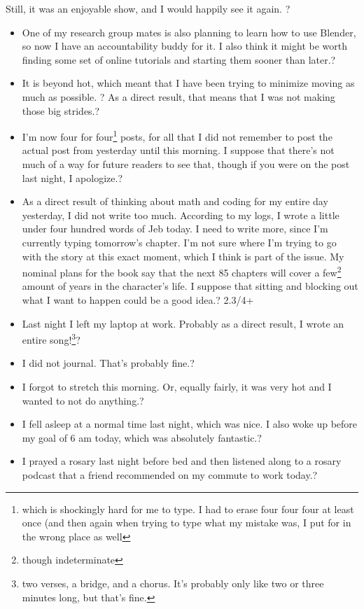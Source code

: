 \documentclass[12pt]{article}[titlepage]
\newcommand{\1}{\={a}}
\newcommand{\2}{\={e}}
\newcommand{\3}{\={\i}}
\newcommand{\4}{\=o}
\newcommand{\5}{\=u}
\newcommand{\6}{\={A}}
\renewcommand{\,}{\textsuperscript{,}}
\begin{document}
Still, it was an enjoyable show, and I would happily see it again.
?
\begin{itemize}
\item One of my research group mates is also planning to learn how to use Blender, so now I have an accountability buddy for it.
I also think it might be worth finding some set of online tutorials and starting them sooner than later.?
\item It is beyond hot, which meant that I have been trying to minimize moving as much as possible. ?
As a direct result, that means that I was not making those big strides.?
\item I'm now four for four\footnote{which is shockingly hard for me to type. I had to erase four four four at least once (and then again when trying to type what my mistake was, I put for in the wrong place as well} posts, for all that I did not remember to post the actual post from yesterday until this morning.
I suppose that there's not much of a way for future readers to see that, though if you were on the post last night, I apologize.?
\item As a direct result of thinking about math and coding for my entire day yesterday, I did not write too much. According to my logs, I wrote a little under four hundred words of Jeb today. I need to write more, since I'm currently typing tomorrow's chapter.
I'm not sure where I'm trying to go with the story at this exact moment, which I think is part of the issue.
My nominal plans for the book say that the next 85 chapters will cover a few\footnote{though indeterminate} amount of years in the character's life.
I suppose that sitting and blocking out what I want to happen could be a good idea.?
2.3/4+
\item Last night I left my laptop at work.
Probably as a direct result, I wrote an entire song!\footnote{two verses, a bridge, and a chorus.
It's probably only like two or three minutes long, but that's fine.}?
\item I did not journal. That's probably fine.?
\item I forgot to stretch this morning.
Or, equally fairly, it was very hot and I wanted to not do anything.?
\item I fell asleep at a normal time last night, which was nice. I also woke up before my goal of 6 am today, which was absolutely fantastic.?
\item I prayed a rosary last night before bed and then listened along to a rosary podcast that a friend recommended on my commute to work today.?
\end{itemize}
\end{document}
